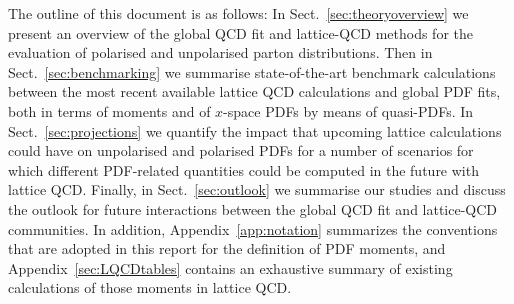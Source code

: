 The outline of this document is as follows:
%
In Sect.~\ref{sec:theoryoverview} we present an overview of
the global QCD fit and lattice-QCD methods for the evaluation
of polarised and unpolarised parton distributions.
%
Then in Sect.~\ref{sec:benchmarking}
we summarise state-of-the-art benchmark
calculations between the most
recent available lattice QCD calculations and global PDF fits,
both in terms of moments and of $x$-space PDFs by means of
quasi-PDFs.
%
In Sect.~\ref{sec:projections} we quantify the impact that
upcoming lattice calculations could have on unpolarised
and polarised PDFs for a number of scenarios for which
different PDF-related quantities could be computed in the future with
lattice QCD.
%
Finally, in Sect.~\ref{sec:outlook} we summarise our studies
and discuss the outlook for future interactions between
the global QCD fit and lattice-QCD communities.
%
In addition, Appendix~\ref{app:notation} summarizes the conventions
that are adopted in this report for the definition of PDF
moments, and
Appendix~\ref{sec:LQCDtables} contains an exhaustive summary of existing calculations
of those moments in lattice QCD.
